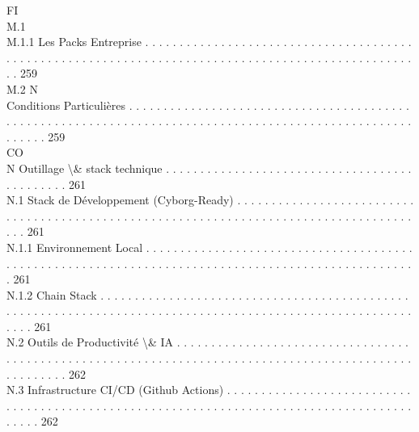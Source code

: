 \documentclass[12pt,landscape,a4paper]{article}
\begin{document}
\vspace{0.5em}
\vspace{0.5em}
\vspace{0.5em}
FI\\
M.1\\
M.1.1               Les Packs Entreprise . . . . . . . . . . . . . . . . . . . . . . . . . . . . . . . . . . . . . . . . . . . . . . . . . . . . . . . . . . . . . . . . . . . . . . . . . . . . . . . . . . . . . . . . . . . . . . . . . . . . 259\\
M.2                                                                           N\\
Conditions Particulières . . . . . . . . . . . . . . . . . . . . . . . . . . . . . . . . . . . . . . . . . . . . . . . . . . . . . . . . . . . . . . . . . . . . . . . . . . . . . . . . . . . . . . . . . . . . . . . . . . . . . . . . . . 259\\
CO\\
N     Outillage \textbackslash{}& stack technique . . . . . . . . . . . . . . . . . . . . . . . . . . . . . . . . . . . . . . . . . . . . . 261\\
N.1     Stack de Développement (Cyborg-Ready) . . . . . . . . . . . . . . . . . . . . . . . . . . . . . . . . . . . . . . . . . . . . . . . . . . . . . . . . . . . . . . . . . . . . . . . . . . . . . . . . . . . . . . . . 261\\
N.1.1               Environnement Local . . . . . . . . . . . . . . . . . . . . . . . . . . . . . . . . . . . . . . . . . . . . . . . . . . . . . . . . . . . . . . . . . . . . . . . . . . . . . . . . . . . . . . . . . . . . . . . . . . . 261\\
N.1.2               Chain Stack . . . . . . . . . . . . . . . . . . . . . . . . . . . . . . . . . . . . . . . . . . . . . . . . . . . . . . . . . . . . . . . . . . . . . . . . . . . . . . . . . . . . . . . . . . . . . . . . . . . . . . . . . . . . 261\\
N.2     Outils de Productivité \textbackslash{}& IA . . . . . . . . . . . . . . . . . . . . . . . . . . . . . . . . . . . . . . . . . . . . . . . . . . . . . . . . . . . . . . . . . . . . . . . . . . . . . . . . . . . . . . . . . . . . . . . . . . . . . . 262\\
N.3     Infrastructure CI/CD (Github Actions) . . . . . . . . . . . . . . . . . . . . . . . . . . . . . . . . . . . . . . . . . . . . . . . . . . . . . . . . . . . . . . . . . . . . . . . . . . . . . . . . . . . . . . . . . . . 262\\
\end{document}
